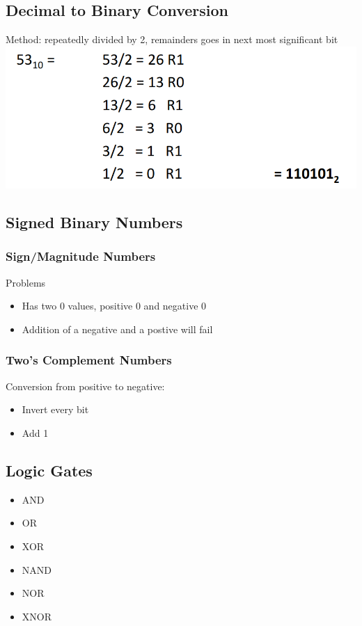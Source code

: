 \documentclass[12pt]{article}
\begin{document}
\subsection{Decimal to Binary Conversion}
Method: repeatedly divided by 2, remainders goes in next most significant bit
\includegraphics[width=\textwidth]{DecimalToBinary.png}
\subsection{Signed Binary Numbers}
\subsubsection{Sign/Magnitude Numbers}
Problems
\begin{itemize}
    \item Has two 0 values, positive 0 and negative 0
    \item Addition of a negative and a postive will fail
\end{itemize}
\subsubsection{Two's Complement Numbers}
Conversion from positive to negative:
\begin{itemize}
    \item Invert every bit
    \item Add 1
\end{itemize}
\subsection{Logic Gates}
\begin{itemize}
    \item AND 
    \item OR 
    \item XOR
    \item NAND
    \item NOR
    \item XNOR
\end{itemize}
\end{document}

